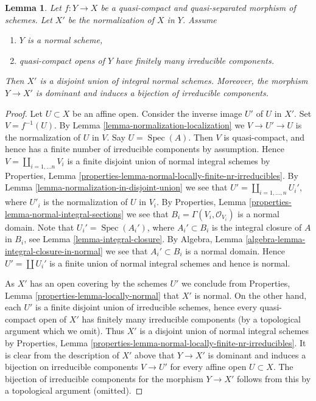\documentclass[10pt,a4paper]{amsart}
\theoremstyle{plain}
\newtheorem{lemma}[subsection]{Lemma}
\theoremstyle{definition}
\theoremstyle{remark}
\numberwithin{equation}{subsection}
\def\Spec{\mathop{\mathrm{Spec}}}
\begin{document}
\begin{lemma}
\label{lemma-normal-normalization}
Let $f : Y \to X$ be a quasi-compact and quasi-separated morphism
of schemes. Let $X'$ be the normalization of $X$ in $Y$. Assume
\begin{enumerate}
\item $Y$ is a normal scheme,
\item quasi-compact opens of $Y$ have finitely many irreducible components.
\end{enumerate}
Then $X'$ is a disjoint union of integral normal schemes. Moreover,
the morphism $Y \to X'$ is dominant and induces a bijection of
irreducible components.
\end{lemma}

\begin{proof}
Let $U \subset X$ be an affine open. Consider the
inverse image $U'$ of $U$ in $X'$.
Set $V = f^{-1}(U)$. By Lemma \ref{lemma-normalization-localization}
we $V \to U' \to U$ is the normalization of $U$ in $V$. Say
$U = \Spec(A)$. Then $V$ is quasi-compact, and hence has a finite number of
irreducible components by assumption. Hence
$V = \coprod_{i = 1, \ldots n} V_i$ is a finite disjoint union of
normal integral schemes by
Properties, Lemma \ref{properties-lemma-normal-locally-finite-nr-irreducibles}.
By Lemma \ref{lemma-normalization-in-disjoint-union}
we see that $U' = \coprod_{i = 1, \ldots, n} U_i'$,
where $U'_i$ is the normalization of $U$ in $V_i$.
By Properties, Lemma \ref{properties-lemma-normal-integral-sections}
we see that $B_i = \Gamma(V_i, \mathcal{O}_{V_i})$ is a normal domain.
Note that $U_i' = \Spec(A_i')$, where $A_i' \subset B_i$
is the integral closure of $A$ in $B_i$, see
Lemma \ref{lemma-integral-closure}. By
Algebra, Lemma \ref{algebra-lemma-integral-closure-in-normal}
we see that $A_i' \subset B_i$ is a normal domain.
Hence $U' = \coprod U_i'$ is a finite union of normal integral schemes
and hence is normal.

\medskip\noindent
As $X'$ has an open covering by the schemes $U'$ we conclude from
Properties, Lemma \ref{properties-lemma-locally-normal} that $X'$ is normal.
On the other hand, each $U'$ is a finite disjoint union of irreducible
schemes, hence every quasi-compact open of $X'$ has finitely many irreducible
components (by a topological argument which we omit). Thus $X'$
is a disjoint union of normal integral schemes by
Properties, Lemma \ref{properties-lemma-normal-locally-finite-nr-irreducibles}.
It is clear from the description of $X'$ above that $Y \to X'$
is dominant and induces a bijection on irreducible components
$V \to U'$ for every affine open $U \subset X$. The bijection of
irreducible components for the morphism $Y \to X'$
follows from this by a topological argument (omitted).
\end{proof}
\end{document}
